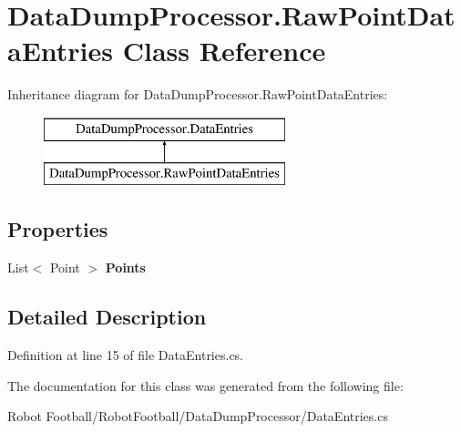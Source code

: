 \hypertarget{class_data_dump_processor_1_1_raw_point_data_entries}{\section{Data\-Dump\-Processor.\-Raw\-Point\-Data\-Entries Class Reference}
\label{class_data_dump_processor_1_1_raw_point_data_entries}
}
Inheritance diagram for Data\-Dump\-Processor.\-Raw\-Point\-Data\-Entries\-:\begin{figure}[H]
\begin{center}
\leavevmode
\includegraphics[height=2.000000cm]{class_data_dump_processor_1_1_raw_point_data_entries}
\end{center}
\end{figure}
\subsection*{Properties}
\begin{DoxyCompactItemize}
\item 
\hypertarget{class_data_dump_processor_1_1_raw_point_data_entries_a0b8308891105490dc9edff5c6e9ad84f}{List$<$ Point $>$ {\bfseries Points}}\label{class_data_dump_processor_1_1_raw_point_data_entries_a0b8308891105490dc9edff5c6e9ad84f}

\end{DoxyCompactItemize}


\subsection{Detailed Description}


Definition at line 15 of file Data\-Entries.\-cs.



The documentation for this class was generated from the following file\-:\begin{DoxyCompactItemize}
\item 
Robot Football/\-Robot\-Football/\-Data\-Dump\-Processor/Data\-Entries.\-cs\end{DoxyCompactItemize}

